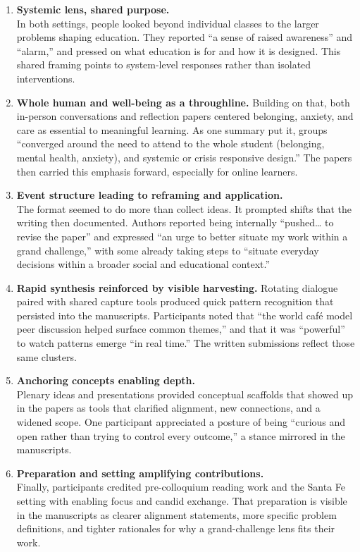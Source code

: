 \documentclass[
  letterpaper,
  DIV=11,
  numbers=noendperiod]{scrartcl}
\begin{document}
\begin{enumerate}
\def\labelenumi{\arabic{enumi}.}
\item
  \textbf{Systemic lens, shared purpose.}\\
  In both settings, people looked beyond individual classes to the
  larger problems shaping education. They reported ``a sense of raised
  awareness'' and ``alarm,'' and pressed on what education is for and
  how it is designed. This shared framing points to system-level
  responses rather than isolated interventions.
\item
  \textbf{Whole human and well-being as a throughline.} Building on
  that, both in-person conversations and reflection papers centered
  belonging, anxiety, and care as essential to meaningful learning. As
  one summary put it, groups ``converged around the need to attend to
  the whole student (belonging, mental health, anxiety), and systemic or
  crisis responsive design.'' The papers then carried this emphasis
  forward, especially for online learners.
\item
  \textbf{Event structure leading to reframing and application.}\\
  The format seemed to do more than collect ideas. It prompted shifts
  that the writing then documented. Authors reported being internally
  ``pushed\ldots{} to revise the paper'' and expressed ``an urge to
  better situate my work within a grand challenge,'' with some already
  taking steps to ``situate everyday decisions within a broader social
  and educational context.''
\item
  \textbf{Rapid synthesis reinforced by visible harvesting.} Rotating
  dialogue paired with shared capture tools produced quick pattern
  recognition that persisted into the manuscripts. Participants noted
  that ``the world café model peer discussion helped surface common
  themes,'' and that it was ``powerful'' to watch patterns emerge ``in
  real time.'' The written submissions reflect those same clusters.
\item
  \textbf{Anchoring concepts enabling depth.}\\
  Plenary ideas and presentations provided conceptual scaffolds that
  showed up in the papers as tools that clarified alignment, new
  connections, and a widened scope. One participant appreciated a
  posture of being ``curious and open rather than trying to control
  every outcome,'' a stance mirrored in the manuscripts.
\item
  \textbf{Preparation and setting amplifying contributions.}\\
  Finally, participants credited pre-colloquium reading work and the
  Santa Fe setting with enabling focus and candid exchange. That
  preparation is visible in the manuscripts as clearer alignment
  statements, more specific problem definitions, and tighter rationales
  for why a grand-challenge lens fits their work.
\end{enumerate}
\end{document}
